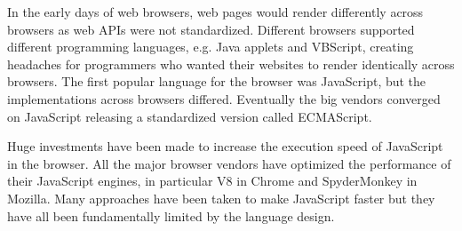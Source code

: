 \documentclass[11pt]{book}
\begin{document}








In the early days of web browsers, web pages would render differently across browsers as web APIs were not standardized. Different browsers supported different programming languages, e.g. Java applets and VBScript, creating headaches for programmers who wanted their websites to render identically across browsers. The first popular language for the browser was JavaScript, but the implementations across browsers differed. Eventually the big vendors converged on JavaScript releasing a standardized version called ECMAScript. 

Huge investments have been made to increase the execution speed of JavaScript in the browser. 
All the major browser vendors have optimized the performance of their JavaScript engines, in particular V8 in Chrome and SpyderMonkey in Mozilla. Many approaches have been taken to make JavaScript faster but they have all been fundamentally limited by the language design. 
\end{document}
